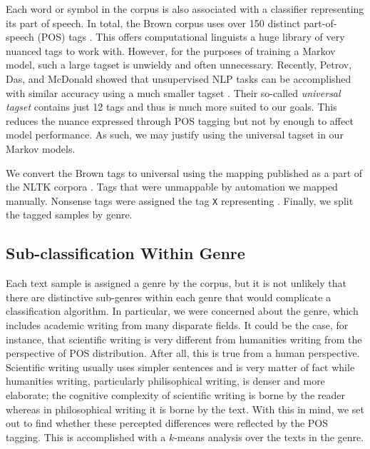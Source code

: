 \documentclass{article}
\begin{document}
Each word or symbol in the corpus is also associated with a classifier representing its part of speech. In total, the Brown corpus uses over 150 distinct part-of-speech (POS) tags \cite{BrownManual}. This offers computational linguists a huge library of very nuanced tags to work with. However, for the purposes of training a Markov model, such a large tagset is unwieldy and often unnecessary. Recently, Petrov, Das, and McDonald showed that unsupervised NLP tasks can be accomplished with similar accuracy using a much smaller tagset \cite{Universal}. Their so-called \textit{universal tagset} contains just 12 tags and thus is much more suited to our goals. This reduces the nuance expressed through POS tagging but not by enough to affect model performance. As such, we may justify using the universal tagset in our Markov models.

We convert the Brown tags to universal using the mapping published as a part of the NLTK corpora \cite{NLTK}. Tags that were unmappable by automation we mapped manually. Nonsense tags were assigned the tag \verb|X| representing . Finally, we split the tagged samples by genre.

\subsection{Sub-classification Within Genre}
Each text sample is assigned a genre by the corpus, but it is not unlikely that there are distinctive sub-genres within each genre that would complicate a classification algorithm. In particular, we were concerned about the  genre, which includes academic writing from many disparate fields. It could be the case, for instance, that scientific writing is very different from humanities writing from the perspective of POS distribution. After all, this is true from a human perspective. Scientific writing usually uses simpler sentences and is very matter of fact while humanities writing, particularly philisophical writing, is denser and more elaborate; the cognitive complexity of scientific writing is borne by the reader whereas in philosophical writing it is borne by the text. With this in mind, we set out to find whether these percepted differences were reflected by the POS tagging. This is accomplished with a $k$-means analysis over the texts in the genre.
\end{document}
